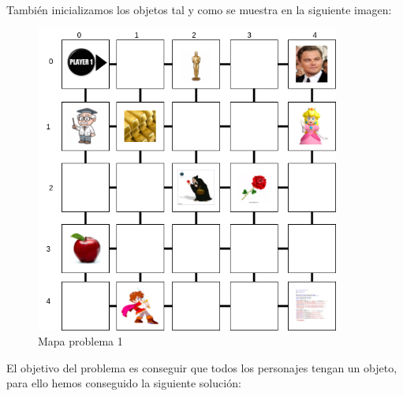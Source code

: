 \documentclass[12pt]{article}
\begin{document}
También inicializamos los objetos tal y como se muestra en la siguiente imagen:

\begin{figure}[H] 
	\centering
	\includegraphics[width=10cm]{Ej1.png}
	\caption{Mapa problema 1}
\end{figure}

El objetivo del problema es conseguir que todos los personajes tengan un objeto, para ello hemos conseguido la siguiente solución:
\end{document}
